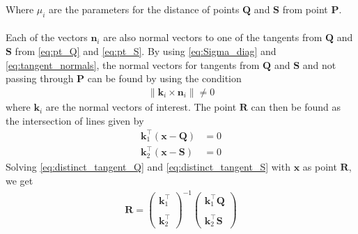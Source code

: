 \documentclass[journal,10pt,twocolumn]{article}
\providecommand{\norm}[1]{\left\lVert#1\right\rVert}
\let\vec\mathbf
\newcommand{\myvec}[1]{\ensuremath{\begin{pmatrix}#1\end{pmatrix}}}
\providecommand{\brak}[1]{\ensuremath{\left(#1\right)}}
\begin{document}
Where $\mu_i$ are the parameters for the distance of points $\vec{Q}$ and $\vec{S}$ from point $\vec{P}$.\\\\
Each of the vectors $\vec{n}_i$ are also normal vectors to one of the tangents from $\vec{Q}$ and $\vec{S}$ from \eqref{eq:pt_Q} and \eqref{eq:pt_S}. By using \eqref{eq:Sigma_diag} and \eqref{eq:tangent_normals}, the normal vectors for tangents from $\vec{Q}$ and $\vec{S}$ and not passing through $\vec{P}$ can be found by using the 
condition
\begin{align}
	\label{eq:diff_normal_cond}
	\norm{\vec{k}_i\times\vec{n}_i} \neq 0   
\end{align}
where $\vec{k}_i$ are the normal vectors of interest.
The point $\vec{R}$ can then be found as the intersection of lines given by
\begin{align}
	\label{eq:distinct_tangent_Q}
	\vec{k}_1^\top\brak{\vec{x}-\vec{Q}} &= 0\\
	\label{eq:distinct_tangent_S}
	\vec{k}_2^\top\brak{\vec{x}-\vec{S}} &= 0
\end{align}
Solving \eqref{eq:distinct_tangent_Q} and \eqref{eq:distinct_tangent_S} with $\vec{x}$ as point $\vec{R}$, we get
\begin{align}
	\label{eq:point_R_soln}
	\vec{R} = \myvec{\vec{k}_1^\top \\\\ \vec{k}_2^\top}^{-1}\myvec{\vec{k}_1^\top\vec{Q} \\\\ \vec{k}_2^\top\vec{S}}
\end{align}
\end{document}
